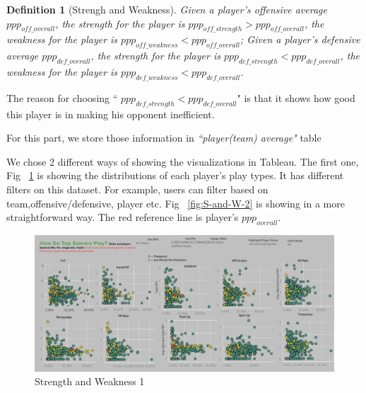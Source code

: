 \documentclass[conference]{IEEEtran}
\newtheorem{definition}{Definition}
\begin{document}
\begin{definition}[Strengh and Weakness]
Given a player's offensive average $ppp_{off\_overall}$, the strength for the player is $ppp_{off\_strength}>ppp_{off\_overall}$, the weakness for the player is $ppp_{off\_weakness}<ppp_{off\_overall}$; Given a player's defensive average $ppp_{def\_overall}$, the strength for the player is $ppp_{def\_strength} < ppp_{def\_overall}$, the weakness for the player is $ppp_{def\_weakness}<ppp_{def\_overall}$.
\end{definition}

The reason for choosing `` $ppp_{def\_strength} < ppp_{def\_overall}$" is that it shows how good this player is in making his opponent inefficient.

For this part, we store those information in \textit{``player(team) average"} table

We chose 2 different ways of showing the visualizations in Tableau. The first one, Fig ~\ref{fig:S-and-W-1} is showing the distributions of each player's play types. It has different filters on this dataset. For example, users can filter based on team,offensive/defensive, player etc. Fig ~\ref{fig:S-and-W-2} is showing in a more straightforward way. The red reference line is player's $ppp_{overall}$.

\begin{figure}
  \includegraphics[width=\linewidth]{Strength_Weakness.jpg}
  \caption{Strength and Weakness 1}
  \vspace{-1mm}
  \label{fig:S-and-W-1}
\end{figure}
\end{document}
